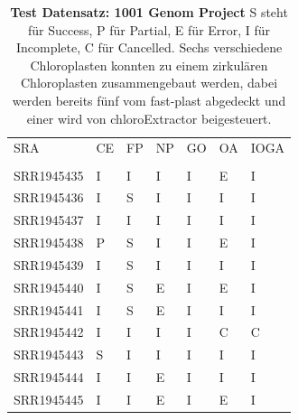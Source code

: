 \documentclass{scrartcl}
\begin{document}
\begin{table}[!h]
\caption[Test Datensatz: 1001 Genom Project, 11 Datensätze]{\textbf{Test Datensatz: 1001 Genom Project} S steht für Success, P für Partial, E für Error, I für Incomplete, C für Cancelled. Sechs verschiedene Chloroplasten konnten zu einem zirkulären Chloroplasten zusammengebaut werden, dabei werden bereits fünf vom fast-plast abgedeckt und einer wird von chloroExtractor beigesteuert. }


\begin{center}
\begin{tabular}{lllllll}
SRA & CE & FP & NP & GO & OA & IOGA\\
 &  &  &  &  &  & \\
\hline
SRR1945435 & I & I & I & I & E & I\\
SRR1945436 & I & S & I & I & I & I\\
SRR1945437 & I & I & I & I & I & I\\
SRR1945438 & P & S & I & I & E & I\\
SRR1945439 & I & S & I & I & I & I\\
SRR1945440 & I & S & E & I & E & I\\
SRR1945441 & I & S & E & I & I & I\\
SRR1945442 & I & I & I & I & C & C\\
SRR1945443 & S & I & I & I & I & I\\
SRR1945444 & I & I & E & I & I & I\\
SRR1945445 & I & I & E & I & E & I\\
\end{tabular}
\end{center}
\end{table}
\end{document}
